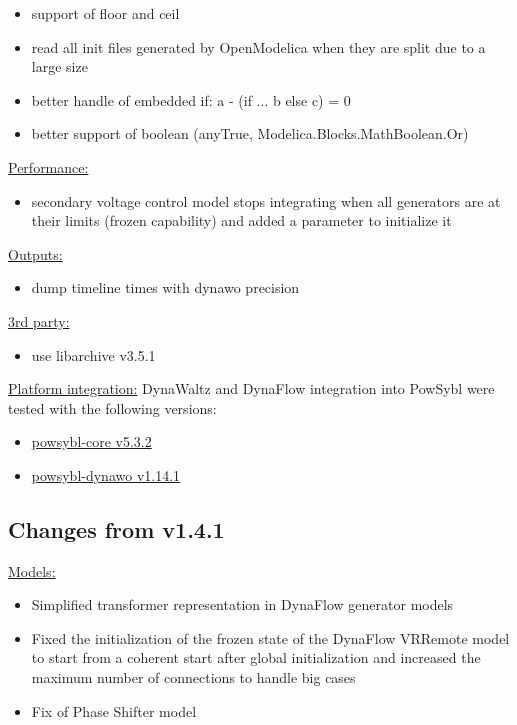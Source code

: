 \documentclass[a4paper, 12pt]{report}
\begin{document}
\begin{itemize}
\item support of floor and ceil
\item read all init files generated by OpenModelica when they are split due to a large size
\item better handle of embedded if: a - (if ... b else c) = 0
\item better support of boolean (anyTrue, Modelica.Blocks.MathBoolean.Or)
\end{itemize}

\underline{Performance:}

\begin{itemize}
\item secondary voltage control model stops integrating when all generators are at their limits (frozen capability) and added a parameter to initialize it
\end{itemize}

\underline{Outputs:}

\begin{itemize}
\item dump timeline times with dynawo precision
\end{itemize}

\underline{3rd party:}

\begin{itemize}
\item use libarchive v3.5.1
\end{itemize}

\underline{Platform integration:}
DynaWaltz and DynaFlow integration into PowSybl were tested with the following versions:
\begin{itemize}
\item \href{https://github.com/powsybl/powsybl-core/releases/tag/v5.3.2}{powsybl-core v5.3.2}
\item \href{https://github.com/powsybl/powsybl-dynawo/releases/tag/v1.14.1}{powsybl-dynawo v1.14.1}
\end{itemize}


\subsection{Changes from v1.4.1}
\underline{Models:}

\begin{itemize}
\item Simplified transformer representation in DynaFlow generator models
\item Fixed the initialization of the frozen state of the DynaFlow VRRemote model to start from a coherent start after global initialization and increased the maximum number of connections to handle big cases
\item Fix of Phase Shifter model
\end{itemize}
\end{document}
